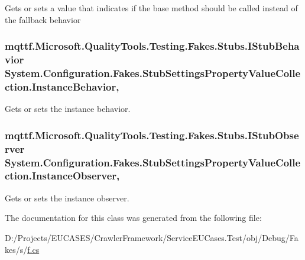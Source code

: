 Gets or sets a value that indicates if the base method should be called instead of the fallback behavior

\hypertarget{class_system_1_1_configuration_1_1_fakes_1_1_stub_settings_property_value_collection_a5acbc496e1167fb0d6f5b3a24275e8d6}{
\subsubsection[{Instance\-Behavior}]{\setlength{\rightskip}{0pt plus 5cm}mqttf.\-Microsoft.\-Quality\-Tools.\-Testing.\-Fakes.\-Stubs.\-I\-Stub\-Behavior System.\-Configuration.\-Fakes.\-Stub\-Settings\-Property\-Value\-Collection.\-Instance\-Behavior\hspace{0.3cm}{\ttfamily [get]}, {\ttfamily [set]}}}\label{class_system_1_1_configuration_1_1_fakes_1_1_stub_settings_property_value_collection_a5acbc496e1167fb0d6f5b3a24275e8d6}


Gets or sets the instance behavior.

\hypertarget{class_system_1_1_configuration_1_1_fakes_1_1_stub_settings_property_value_collection_ac4c2d394e79443f97d1a9815ab31543e}{
\subsubsection[{Instance\-Observer}]{\setlength{\rightskip}{0pt plus 5cm}mqttf.\-Microsoft.\-Quality\-Tools.\-Testing.\-Fakes.\-Stubs.\-I\-Stub\-Observer System.\-Configuration.\-Fakes.\-Stub\-Settings\-Property\-Value\-Collection.\-Instance\-Observer\hspace{0.3cm}{\ttfamily [get]}, {\ttfamily [set]}}}\label{class_system_1_1_configuration_1_1_fakes_1_1_stub_settings_property_value_collection_ac4c2d394e79443f97d1a9815ab31543e}


Gets or sets the instance observer.



The documentation for this class was generated from the following file\-:\begin{DoxyCompactItemize}
\item 
D\-:/\-Projects/\-E\-U\-C\-A\-S\-E\-S/\-Crawler\-Framework/\-Service\-E\-U\-Cases.\-Test/obj/\-Debug/\-Fakes/s/\hyperlink{s_2f_8cs}{f.\-cs}\end{DoxyCompactItemize}
